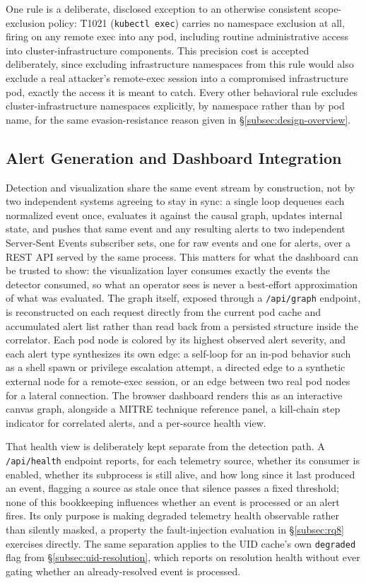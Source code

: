\documentclass{ieeeaccess}
\begin{document}
One rule is a deliberate, disclosed exception to an otherwise
consistent scope-exclusion policy: T1021 (\texttt{kubectl exec}) carries no
namespace exclusion at all, firing on any remote exec into any pod,
including routine administrative access into cluster-infrastructure
components. This precision cost is accepted deliberately, since
excluding infrastructure namespaces from this rule would also exclude
a real attacker's remote-exec session into a compromised
infrastructure pod, exactly the access it is meant to catch. Every
other behavioral rule excludes cluster-infrastructure namespaces
explicitly, by namespace rather than by pod name, for the same
evasion-resistance reason given in \S\ref{subsec:design-overview}.

\subsection{Alert Generation and Dashboard Integration}
\label{subsec:alert-dashboard}

Detection and visualization share the same event stream by
construction, not by two independent systems agreeing to stay in
sync: a single loop dequeues each normalized event once, evaluates it
against the causal graph, updates internal state, and pushes that
same event and any resulting alerts to two independent Server-Sent
Events subscriber sets, one for raw events and one for alerts, over a
REST API served by the same process. This matters for what the
dashboard can be trusted to show: the visualization layer consumes
exactly the events the detector consumed, so what an operator sees is
never a best-effort approximation of what was evaluated. The graph
itself, exposed through a \texttt{/api/graph} endpoint, is reconstructed on
each request directly from the current pod cache and accumulated
alert list rather than read back from a persisted structure inside
the correlator. Each pod node is colored by its highest observed alert
severity, and each alert type synthesizes its own edge: a self-loop
for an in-pod behavior such as a shell spawn or privilege escalation
attempt, a directed edge to a synthetic external node for a
remote-exec session, or an edge between two real pod nodes for a
lateral connection. The browser dashboard renders this as an
interactive canvas graph, alongside a MITRE technique reference panel,
a kill-chain \cite{ref18} step indicator for correlated alerts, and a
per-source health view.

That health view is deliberately kept separate from the detection
path. A \texttt{/api/health} endpoint reports, for each telemetry source,
whether its consumer is enabled, whether its subprocess is still
alive, and how long since it last produced an event, flagging a
source as stale once that silence passes a fixed threshold; none of
this bookkeeping influences whether an event is processed or an alert
fires. Its only purpose is making degraded telemetry health observable
rather than silently masked, a property the fault-injection evaluation
in \S\ref{subsec:rq8} exercises directly. The same separation applies to the
UID cache's own \texttt{degraded} flag from \S\ref{subsec:uid-resolution}, which reports on
resolution health without ever gating whether an already-resolved
event is processed.
\end{document}
